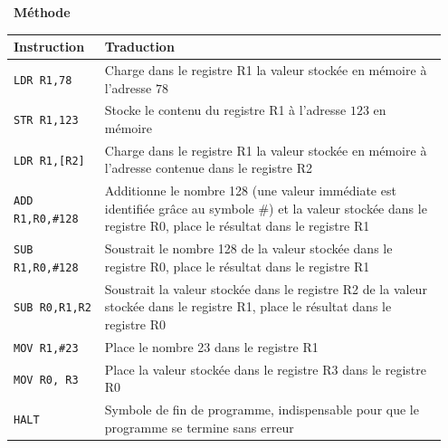 \documentclass[a4paper, french, 11pt]{article}  %
\newcounter{prog}
\newenvironment{methode}[1]
{\par \medskip    \noindent  
 \begin {bclogo}[arrondi =0.1,logo=\bcoutil, marge=4,noborder = true] {~\textbf{Méthode}   {\itshape #1} }  \par}
{
\end{bclogo}
 \par \bigskip }
\begin{document}
\begin{methode}{}
\begin{center}
\begin{tabular}{|p{0.2\linewidth}|p{0.75\linewidth}|}
\hline 
\textbf{Instruction} & \textbf{Traduction} \\ 
\hline 
\texttt{LDR R1,78} & Charge dans le registre R1 la valeur stockée en mémoire à l'adresse $78$ \\ 
\hline 
\texttt{STR R1,123} & Stocke le contenu du registre R1 à l'adresse $123$ en mémoire \\ 
\hline
\texttt{LDR R1,[R2]} & Charge dans le registre R1 la valeur stockée en mémoire à l'adresse contenue dans le registre R2 \\ 
\hline 
\texttt{ADD R1,R0,\#128} & Additionne le nombre 128 (une valeur immédiate est identifiée grâce au symbole \#) et la valeur stockée dans le registre R0, place
le résultat dans le registre R1 \\ 
\hline 
\texttt{SUB R1,R0,\#128} & Soustrait le nombre 128 de la valeur stockée dans le registre R0, place le résultat dans le registre R1 \\ 
\hline 
\texttt{SUB R0,R1,R2} & Soustrait la valeur stockée dans le registre R2 de la valeur stockée dans le registre R1, place le résultat dans le registre R0 \\ 
\hline 
\texttt{MOV R1,\#23} & Place le nombre 23 dans le registre R1 \\ 
\hline 
\texttt{MOV R0, R3} & Place la valeur stockée dans le registre R3 dans le registre R0 \\ 
\hline 
\texttt{HALT} & Symbole de fin de programme, indispensable pour que le programme se termine sans erreur \\ 
\hline
\end{tabular} 
\end{center}


\end{methode}
\end{document}
